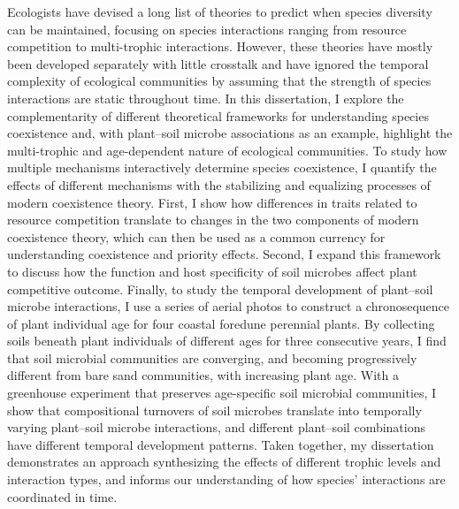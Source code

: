 \doublespacing
Ecologists have devised a long list of theories to predict when species diversity can be maintained, focusing on species interactions ranging from resource competition to multi-trophic interactions. 
However, these theories have mostly been developed separately with little crosstalk and have ignored the temporal complexity of ecological communities by assuming that the strength of species interactions are static throughout time.
In this dissertation, I explore the complementarity of different theoretical frameworks for understanding species coexistence and, with plant--soil microbe associations as an example, highlight the multi-trophic and age-dependent nature of ecological communities. 
To study how multiple mechanisms interactively determine species coexistence, I quantify the effects of different mechanisms with the stabilizing and equalizing processes of modern coexistence theory. 
First, I show how differences in traits related to resource competition translate to changes in the two components of modern coexistence theory, which can then be used as a common currency for understanding coexistence and priority effects.
Second, I expand this framework to discuss how the function and host specificity of soil microbes affect plant competitive outcome.
Finally, to study the temporal development of plant--soil microbe interactions, I use a series of aerial photos to construct a chronosequence of plant individual age for four coastal foredune perennial plants.
By collecting soils beneath plant individuals of different ages for three consecutive years, I find that soil microbial communities are converging, and becoming progressively different from bare sand communities, with increasing plant age.
With a greenhouse experiment that preserves age-specific soil microbial communities, I show that compositional turnovers of soil microbes translate into temporally varying plant--soil microbe interactions, and different plant--soil combinations have different temporal development patterns.
Taken together, my dissertation demonstrates an approach synthesizing the effects of different trophic levels and interaction types, and informs our understanding of how species' interactions are coordinated in time.